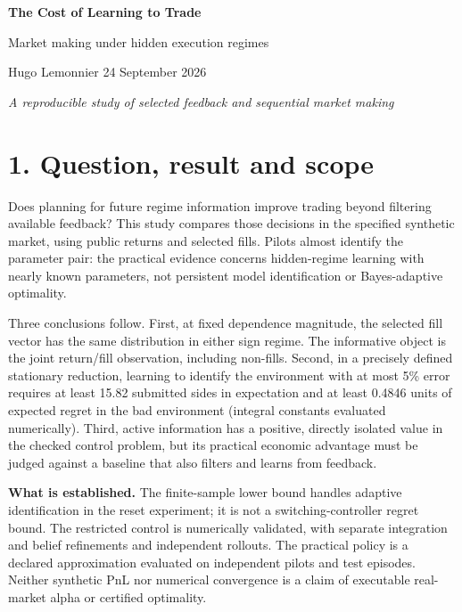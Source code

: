 \documentclass[11pt,a4paper]{article}
\begin{document}
\thispagestyle{empty}
{\Huge\bfseries The Cost of Learning to Trade}\par
\vspace{4pt}
{\Large Market making under hidden execution regimes}\par
\vspace{8pt}
Hugo Lemonnier \hfill 24 September 2026\par
\textit{A reproducible study of selected feedback and sequential market making}

\section*{1. Question, result and scope}
Does planning for future regime information improve trading beyond filtering
available feedback? This study compares those decisions in the specified synthetic
market, using public returns and selected fills. Pilots almost identify the
parameter pair: the practical evidence concerns hidden-regime learning with
nearly known parameters, not persistent model identification or Bayes-adaptive
optimality.

Three conclusions follow. First, at fixed dependence magnitude, the selected fill
vector has the same distribution in either sign regime. The informative object is the joint return/fill
observation, including non-fills. Second, in a precisely defined stationary
reduction, learning to identify the environment with at most 5\% error requires
at least 15.82 submitted sides in expectation and at least 0.4846 units of
expected regret in the bad environment (integral constants evaluated numerically).
Third, active information has a positive, directly isolated value in the checked
control problem, but its practical economic advantage must be judged against a
baseline that also filters and learns from feedback.



\textbf{What is established.} The finite-sample lower bound handles adaptive
identification in the reset experiment; it is not a switching-controller regret bound.
The restricted control is numerically
validated, with separate integration and belief refinements and independent
rollouts. The practical policy is a declared approximation evaluated on independent
pilots and test episodes. Neither synthetic PnL nor numerical convergence is a
claim of executable real-market alpha or certified optimality.
\end{document}
